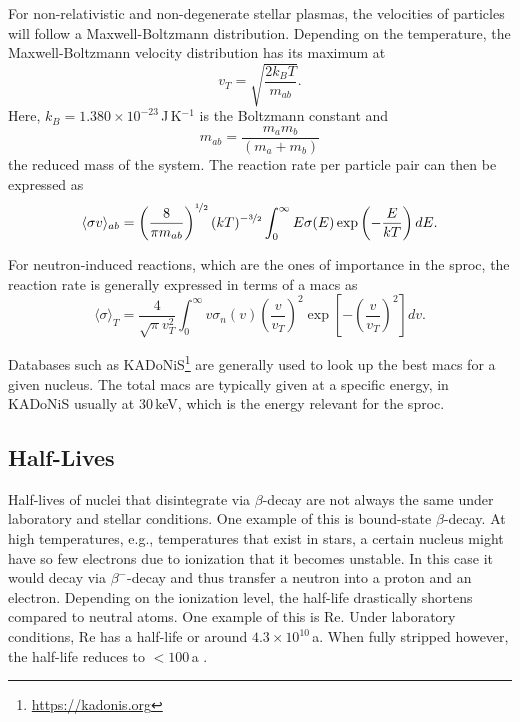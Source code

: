 For non-relativistic and non-degenerate stellar plasmas, the velocities of particles will follow a Maxwell-Boltzmann distribution. Depending on the temperature, the Maxwell-Boltzmann velocity distribution has its maximum at
\begin{equation}
    v_T = \sqrt{\frac{2k_B T}{m_{ab}}}. \label{eqn:s-process:max_velocity_mb}
\end{equation}
Here, $k_B = 1.380 \times 10^{-23}$\,J\,K$^{-1}$ is the Boltzmann constant and
\begin{equation}
    m_{ab} = \frac{m_am_b}{(m_a + m_b)} \label{eqn:s-process:reduced_mass}
\end{equation} 
the reduced mass of the system. The reaction rate per particle pair can then be expressed as
\begin{equation}
     \langle \sigma v \rangle_{ab} = \left( \frac{8}{\pi m_{ab}} \right)^{\nicefrac{1}{2}} (kT)^{-\nicefrac{3}{2}} \int_0^\infty E\sigma(E) \exp\left(-\frac{E}{kT}\right)dE.
 \end{equation} 

 For neutron-induced reactions, which are the ones of importance in the \ac{sproc}, the reaction rate is generally expressed in terms of a \ac{macs} as
 \begin{equation}
     \langle\sigma\rangle_T = \frac{4}{\sqrt{\pi} v_T^2} \int_0^\infty v\sigma_n(v) \left(\frac{v}{v_T}\right)^2 \exp\left[-\left(\frac{v}{v_T}\right)^2\right]dv. \label{eqn:s-process:macs}
 \end{equation}

Databases such as KADoNiS\footnote{\url{https://kadonis.org}} are generally used to look up the best \ac{macs} for a given nucleus. The total \ac{macs} are typically given at a specific energy, in KADoNiS usually at 30\,keV, which is the energy relevant for the \ac{sproc}.


\subsection{Half-Lives}

Half-lives of nuclei that disintegrate via $\beta$-decay are not always the same under laboratory and stellar conditions. One example of this is bound-state $\beta$-decay. At high temperatures, e.g., temperatures that exist in stars, a certain nucleus might have so few electrons due to ionization that it becomes unstable. In this case it would decay via $\beta^-$-decay and thus transfer a neutron into a proton and an electron. Depending on the ionization level, the half-life drastically shortens compared to neutral atoms. One example of this is Re. Under laboratory conditions, Re has a half-life or around $4.3\times10^{10}$\,a. When fully stripped however, the half-life reduces to $<100$\,a \citep{nolden97}.

